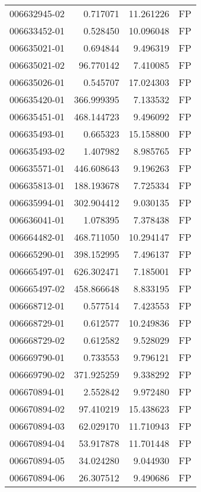 \begin{tabular}{lrrl}
006632945-02 &    0.717071 &      11.261226 &   FP \\
006633452-01 &    0.528450 &      10.096048 &   FP \\
006635021-01 &    0.694844 &       9.496319 &   FP \\
006635021-02 &   96.770142 &       7.410085 &   FP \\
006635026-01 &    0.545707 &      17.024303 &   FP \\
006635420-01 &  366.999395 &       7.133532 &   FP \\
006635451-01 &  468.144723 &       9.496092 &   FP \\
006635493-01 &    0.665323 &      15.158800 &   FP \\
006635493-02 &    1.407982 &       8.985765 &   FP \\
006635571-01 &  446.608643 &       9.196263 &   FP \\
006635813-01 &  188.193678 &       7.725334 &   FP \\
006635994-01 &  302.904412 &       9.030135 &   FP \\
006636041-01 &    1.078395 &       7.378438 &   FP \\
006664482-01 &  468.711050 &      10.294147 &   FP \\
006665290-01 &  398.152995 &       7.496137 &   FP \\
006665497-01 &  626.302471 &       7.185001 &   FP \\
006665497-02 &  458.866648 &       8.833195 &   FP \\
006668712-01 &    0.577514 &       7.423553 &   FP \\
006668729-01 &    0.612577 &      10.249836 &   FP \\
006668729-02 &    0.612582 &       9.528029 &   FP \\
006669790-01 &    0.733553 &       9.796121 &   FP \\
006669790-02 &  371.925259 &       9.338292 &   FP \\
006670894-01 &    2.552842 &       9.972480 &   FP \\
006670894-02 &   97.410219 &      15.438623 &   FP \\
006670894-03 &   62.029170 &      11.710943 &   FP \\
006670894-04 &   53.917878 &      11.701448 &   FP \\
006670894-05 &   34.024280 &       9.044930 &   FP \\
006670894-06 &   26.307512 &       9.490686 &   FP \\

\end{tabular}
